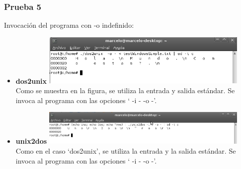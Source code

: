 \documentclass[a4paper,10pt]{article}
\begin{document}
    \subsubsection{Prueba 5}
    Invocaci\'on del programa con -o indefinido:
      \begin{itemize}
      \item \textbf{dos2unix}
      \newline
      \includegraphics[width=10cm, viewport=0 0 662 164]{../Informe/Imagenes/prueba5-invocacion-dos2unix.png}
      \newline	
      Como se muestra en la figura, se utiliza la entrada y salida est\'andar. Se invoca al programa con las opciones
      ` -i - -o -'.
      \item \textbf{unix2dos}
      \newline
      \includegraphics[width=10cm, viewport=0 0 895 152]{../Informe/Imagenes/prueba5-invocacion-unix2dos.png}	
      \newline
      Como en el caso `dos2unix', se utiliza la entrada y la salida est\'andar. Se invoca al programa con las opciones
      ` -i - -o -'.
      
      \end{itemize}
\end{document}
